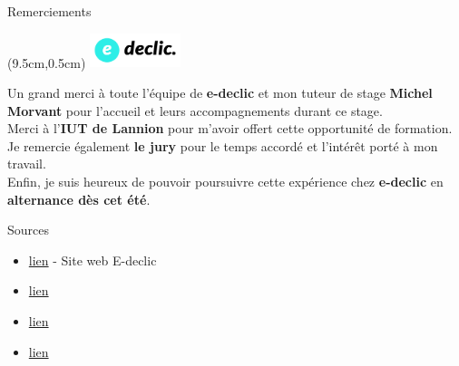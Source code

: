 \documentclass{beamer}
\newcommand{\logoEdeclic}{
	\begin{textblock*}{2cm}(9.5cm,0.5cm)
  		\includegraphics[height=1cm]{../img/logo_e-declic.png}
	\end{textblock*}
}
\begin{document}
\begin{frame}[label=remerciements]{\Large Remerciements}
    \logoEdeclic
    \begin{center}
        \vspace{1em}
        \begin{minipage}{0.9\textwidth}
        		Un grand merci à toute l'équipe de \textbf{e-declic} et mon tuteur de stage \textbf{Michel Morvant} pour l'accueil et leurs accompagnements durant ce stage. \vspace{0.25cm} \\
            Merci à l'\textbf{IUT de Lannion} pour m'avoir offert cette opportunité de formation. \vspace{0.25cm} \\
            Je remercie également \textbf{le jury} pour le temps accordé et l'intérêt porté à mon travail. \vspace{0.25cm} \\
            Enfin, je suis heureux de pouvoir poursuivre cette expérience chez \textbf{e-declic} en \textbf{alternance dès cet été}.
        \end{minipage}
    \end{center}
    \vfill
\end{frame}

\begin{frame}[label=sources]{Sources}
	\begin{itemize}
		\item \href{https://www.e-declic.com/}{lien} - Site web E-declic
		\item \href{https://www.francenum.gouv.fr/activateurs/e-declic}{lien}
		\item \href{https://annuaire-entreprises.data.gouv.fr/entreprise/e-declic-453413296}{lien}
		\item \href{https://entreprises.lefigaro.fr/e-declic-56/entreprise-453413296}{lien}
	\end{itemize}

\end{frame}
\end{document}
